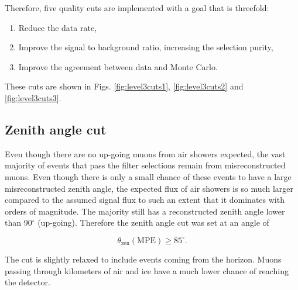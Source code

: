Therefore, five quality cuts are implemented with a goal that is threefold:
\vspace{2mm}
\begin{enumerate}
\item Reduce the data rate,
\item Improve the signal to background ratio, increasing the selection purity,
\item Improve the agreement between data and Monte Carlo.
\end{enumerate}
\vspace{2mm}
\noindent These cuts are shown in Figs. \ref{fig:level3cuts1}, \ref{fig:level3cuts2} and \ref{fig:level3cuts3}.

\subsection{Zenith angle cut}
\label{subsec:zenithanglecut}
Even though there are no up-going muons from air showers expected, the vast majority of events that pass the filter selections remain from misreconstructed muons. Even though there is only a small chance of these events to have a large misreconstructed zenith angle, the expected flux of air showers is so much larger compared to the assumed signal flux to such an extent that it dominates with orders of magnitude. The majority still has a reconstructed zenith angle lower than 90$^\circ$ (up-going). Therefore the zenith angle cut was set at an angle of 

\begin{equation}
\theta_\textrm{zen} (\textrm{MPE}) \geq 85^\circ.
\end{equation}

\noindent The cut is slightly relaxed to include events coming from the horizon. Muons passing through kilometers of air and ice have a much lower chance of reaching the detector.

